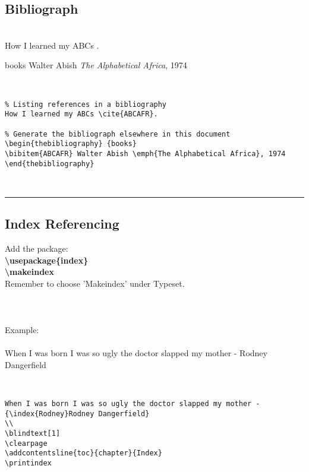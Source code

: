 \documentclass[a4paper,12pt,titlepage]{article}
\begin{document}
\subsection{Bibliograph}
~\\
How I learned my ABCs \cite{ABCAFR}.
\\
\begin{thebibliography} {books}
 Walter Abish \emph{The Alphabetical Africa}, 1974
\end{thebibliography}
~\\
\begin{lstlisting}  
% Listing references in a bibliography
How I learned my ABCs \cite{ABCAFR}. 

% Generate the bibliograph elsewhere in this document
\begin{thebibliography} {books}
\bibitem{ABCAFR} Walter Abish \emph{The Alphabetical Africa}, 1974
\end{thebibliography}
\end{lstlisting}  
~\\
\rule{\linewidth}{0.1mm}








\subsection{Index Referencing}
Add the package: 
\\
\textbf{\textbackslash usepackage\{index\}}
\\
\textbf{\textbackslash makeindex}
\\
Remember to choose 'Makeindex' under Typeset.
\\
\\
\\
\\
Example:
\\
\\
When I was born I was so ugly the doctor slapped my mother - {Rodney Dangerfield}
\\
\blindtext[1]
\printindex
~\\
\begin{lstlisting}  
When I was born I was so ugly the doctor slapped my mother - {\index{Rodney}Rodney Dangerfield}
\\
\blindtext[1]
\clearpage
\addcontentsline{toc}{chapter}{Index}
\printindex
\end{lstlisting}  
\end{document}
